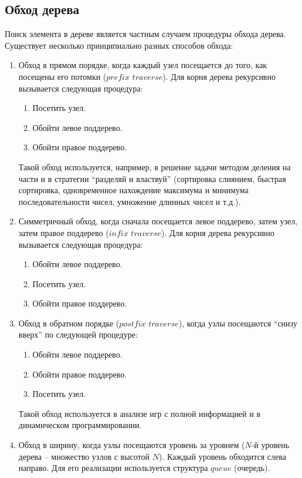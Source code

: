 \documentclass[11pt]{article}
\begin{document}
\subsection{Обход дерева}
Поиск элемента в дереве является частным случаем процедуры обхода дерева.
Существует несколько принципиально разных способов обхода:
\begin{enumerate}
\item Обход в прямом порядке, когда каждый узел посещается до того, как
  посещены его потомки ($prefix$ $traverse$). Для корня дерева рекурсивно
  вызывается следующая процедура:
  \begin{enumerate}
  \item Посетить узел.
  \item Обойти левое поддерево.
  \item Обойти правое поддерево.
  \end{enumerate}
  Такой обход используется, например, в решение задачи методом деления на части
  и в стратегии ``разделяй и властвуй'' (сортировка слиянием, быстрая 
  сортировка, одновременное нахождение максимума и минимума последовательности
  чисел, умножение длинных чисел и т.д.).
\item Симметричный обход, когда сначала посещается левое поддерево, затем
  узел, затем правое поддерево ($infix$ $traverse$). Для корня дерева рекурсивно
  вызывается следующая процедура:
  \begin{enumerate}
  \item Обойти левое поддерево.
  \item Посетить узел.
  \item Обойти правое поддерево.
  \end{enumerate}
\item Обход в обратном порядке ($postfix$ $traverse$), когда узлы посещаются
  ``снизу вверх'' по следующей процедуре:
  \begin{enumerate}
  \item Обойти левое поддерево.
  \item Обойти правое поддерево.
  \item Посетить узел.
  \end{enumerate}
  Такой обход используется в анализе игр с полной информацией и в динамическом
  программировании.
\item Обход в ширину, когда узлы посещаются уровень за уровнем ($N$-й уровень
  дерева -- множество узлов с высотой $N$). Каждый уровень обходится слева
  направо. Для его реализации используется структура $queue$ (очередь).
\end{enumerate}
\end{document}
